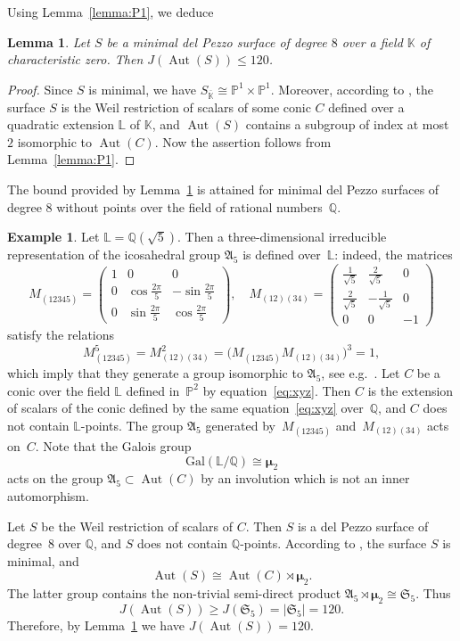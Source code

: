 \documentclass[12pt]{amsart}
\newcounter{cequation}[section]
\newtheorem{lemma}[cequation]{Lemma}
\theoremstyle{definition}
\newtheorem{example}[cequation]{Example}
\theoremstyle{remark}
\newcommand{\QQ}{\mathbb{Q}}
\newcommand{\PP}{\mathbb{P}}
\newcommand{\KK}{\mathbb{K}}
\newcommand{\LL}{\mathbb{L}}
\newcommand{\SSS}{\mathfrak{S}}
\newcommand{\AAA}{\mathfrak{A}}
\newcommand{\mumu}{{\boldsymbol{\mu}}}
\newcommand{\Aut}{\operatorname{Aut}}
\def \ge {\geqslant}
\def \le {\leqslant}
\begin{document}
Using Lemma~\ref{lemma:P1}, we deduce

\begin{lemma}\label{lemma:dP8-minimal}
Let $S$ be a minimal del Pezzo surface of degree $8$ over a field $\KK$
of characteristic zero.
Then $J(\Aut(S))\le 120$.
\end{lemma}

\begin{proof}
Since $S$ is minimal, we have $S_{\bar{\KK}}\cong\PP^1\times\PP^1$.
Moreover, according to \cite[Proposition~7.3]{SV}, the surface $S$
is the Weil restriction of scalars of some conic $C$ defined over a quadratic extension $\LL$ of $\KK$, and
$\Aut(S)$ contains a subgroup of index at most $2$ isomorphic to $\Aut(C)$.
Now the assertion follows from Lemma~\ref{lemma:P1}.
\end{proof}


The bound provided by Lemma~\ref{lemma:dP8-minimal}
is attained for minimal del Pezzo surfaces of degree $8$ without points over the field of rational numbers~$\QQ$.

\begin{example}\label{example:dP8-minimal}
Let $\LL=\QQ(\sqrt{5})$.
Then a three-dimensional irreducible representation
of the icosahedral group $\AAA_5$ is defined over~$\LL$:
indeed, the matrices
$$
M_{(12345)}=\left(\begin{array}{ccc}
1 & 0 & 0\\
0 & \cos\frac{2\pi}{5}  & -\sin\frac{2\pi}{5}\\
0 & \sin\frac{2\pi}{5} & \cos\frac{2\pi}{5}
\end{array}\right),
\quad
M_{(12)(34)}=\left(\begin{array}{ccc}
\frac{1}{\sqrt{5}} & \frac{2}{\sqrt{5}} & 0\\
\frac{2}{\sqrt{5}} & -\frac{1}{\sqrt{5}} & 0\\
0 & 0 & -1
\end{array}\right)
$$
satisfy the relations
$$
M_{(12345)}^5=M_{(12)(34)}^2=\big(M_{(12345)}M_{(12)(34)}\big)^3=1,
$$
which imply that they generate a group isomorphic to $\AAA_5$,
see e.g.~\mbox{\cite[Beispiel~19.9]{Huppert}}.
Let $C$ be a conic over the field $\LL$ defined in~$\PP^2$ by equation~\eqref{eq:xyz}.
Then $C$ is the extension of scalars of the conic defined by the same equation~\eqref{eq:xyz}
over~$\QQ$, and $C$ does not contain $\LL$-points.
The group $\AAA_5$ generated by~$M_{(12345)}$ and~$M_{(12)(34)}$ acts on~$C$.
Note that the Galois group
$$
\mathrm{Gal}(\LL/\QQ)\cong\mumu_2
$$
acts on the group $\AAA_5\subset\Aut(C)$ by an involution which is not an inner automorphism.

Let $S$ be the Weil restriction of scalars of $C$. Then
$S$ is a del Pezzo surface of degree~$8$ over $\QQ$, and $S$ does not contain $\QQ$-points.
According to \cite[Proposition~7.3]{SV}, the surface $S$ is minimal, and
$$
\Aut(S)\cong \Aut(C)\rtimes\mumu_2.
$$
The latter group contains the non-trivial semi-direct product $\AAA_5\rtimes\mumu_2\cong\SSS_5$.
Thus
$$
J(\Aut(S))\ge J(\SSS_5)=|\SSS_5|=120.
$$
Therefore, by Lemma~\ref{lemma:dP8-minimal} we have $J(\Aut(S))=120$.
\end{example}
\end{document}
